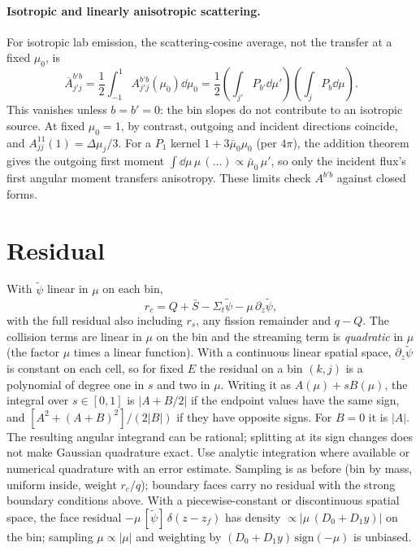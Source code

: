 \documentclass[11pt]{article}
\newcommand{\tpsi}{\tilde\psi}
\newcommand{\Sbar}{\bar S}
\newcommand{\Sigt}{\Sigma_t}
\begin{document}
\paragraph{Isotropic and linearly anisotropic scattering.} For isotropic lab emission,
the scattering-cosine average, not the transfer at a fixed $\mu_0$, is
\[
  \overline A^{b'b}_{j'j}=\frac12\int_{-1}^1 A^{b'b}_{j'j}(\mu_0)\dd\mu_0
  =\frac12\left(\int_{j'}P_{b'}\dd\mu'\right)
             \left(\int_jP_b\dd\mu\right).
\]
This vanishes unless $b=b'=0$: the bin slopes do not contribute to an isotropic
source. At fixed $\mu_0=1$, by contrast, outgoing and incident directions coincide,
and $A^{11}_{jj}(1)=\Delta\mu_j/3$. For a $P_1$ kernel
$1+3\bar\mu_0\mu_0$ (per $4\pi$), the
addition theorem gives the outgoing first moment
$\int\dd\mu\,\mu\,(\ldots)\propto\bar\mu_0\,\mu'$, so only the incident flux's first
angular moment transfers anisotropy. These limits check $A^{b'b}$ against closed forms.

\section{Residual}

With $\tpsi$ linear in $\mu$ on each bin,
\begin{equation}
  r_c = Q + \Sbar - \Sigt\tpsi - \mu\,\partial_z\tpsi ,
\end{equation}
with the full residual also including $r_s$, any fission remainder and $q-Q$.
The collision terms are linear in $\mu$ on the bin and the streaming term is
\emph{quadratic} in $\mu$ (the factor $\mu$ times a linear function). With a continuous
linear spatial space, $\partial_z\tpsi$ is constant on each cell, so for fixed $E$ the
residual on a bin $(k,j)$ is a polynomial of degree one in $s$ and two in $\mu$.
Writing it as $A(\mu)+sB(\mu)$, the integral over $s\in[0,1]$ is
$|A+B/2|$ if the endpoint values have the same sign, and
$[A^2+(A+B)^2]/(2|B|)$ if they have opposite signs. For $B=0$ it is $|A|$.
The resulting angular integrand can be rational; splitting at its sign changes
does not make Gaussian quadrature exact. Use analytic integration where available
or numerical quadrature with an error estimate. Sampling is as before (bin by mass,
uniform inside, weight
$r_c/q$); boundary faces carry no residual with the strong boundary conditions above.
With a piecewise-constant or discontinuous spatial space, the face residual
$-\mu\,[\tpsi]\,\delta(z-z_f)$ has density $\propto|\mu\,(D_0+D_1y)|$ on the bin; sampling
$\mu\propto|\mu|$ and weighting by $(D_0+D_1y)\,\mathrm{sign}(-\mu)$ is unbiased.
\end{document}
